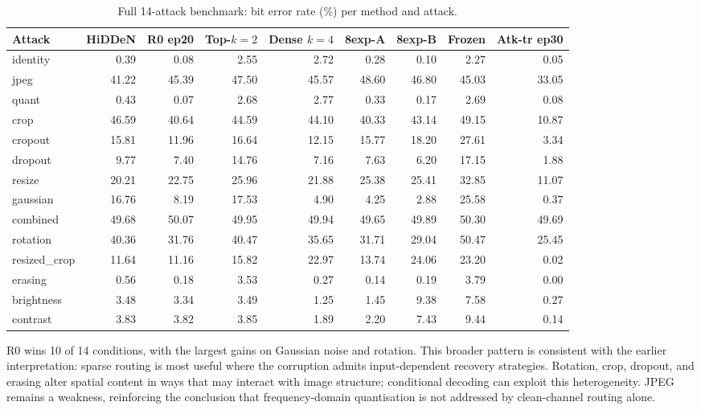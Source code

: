 ﻿\documentclass[12pt, a4paper, twoside]{report}
\numberwithin{equation}{chapter}
\begin{document}
\begin{table}[H]
\centering
\small
\begin{tabular}{@{}l@{\hskip 0.45em}r r r r r r r r@{}}
\toprule
Attack & HiDDeN & R0 ep20 & Top-$k{=}2$ & Dense $k{=}4$ & 8exp-A & 8exp-B & Frozen & Atk-tr ep30 \\
\midrule
identity & 0.39 & 0.08 & 2.55 & 2.72 & 0.28 & 0.10 & 2.27 & 0.05 \\
jpeg & 41.22 & 45.39 & 47.50 & 45.57 & 48.60 & 46.80 & 45.03 & 33.05 \\
quant & 0.43 & 0.07 & 2.68 & 2.77 & 0.33 & 0.17 & 2.69 & 0.08 \\
crop & 46.59 & 40.64 & 44.59 & 44.10 & 40.33 & 43.14 & 49.15 & 10.87 \\
cropout & 15.81 & 11.96 & 16.64 & 12.15 & 15.77 & 18.20 & 27.61 & 3.34 \\
dropout & 9.77 & 7.40 & 14.76 & 7.16 & 7.63 & 6.20 & 17.15 & 1.88 \\
resize & 20.21 & 22.75 & 25.96 & 21.88 & 25.38 & 25.41 & 32.85 & 11.07 \\
gaussian & 16.76 & 8.19 & 17.53 & 4.90 & 4.25 & 2.88 & 25.58 & 0.37 \\
combined & 49.68 & 50.07 & 49.95 & 49.94 & 49.65 & 49.89 & 50.30 & 49.69 \\
rotation & 40.36 & 31.76 & 40.47 & 35.65 & 31.71 & 29.04 & 50.47 & 25.45 \\
resized\_crop & 11.64 & 11.16 & 15.82 & 22.97 & 13.74 & 24.06 & 23.20 & 0.02 \\
erasing & 0.56 & 0.18 & 3.53 & 0.27 & 0.14 & 0.19 & 3.79 & 0.00 \\
brightness & 3.48 & 3.34 & 3.49 & 1.25 & 1.45 & 9.38 & 7.58 & 0.27 \\
contrast & 3.83 & 3.82 & 3.85 & 1.89 & 2.20 & 7.43 & 9.44 & 0.14 \\
\bottomrule
\end{tabular}
\caption{Full 14-attack benchmark: bit error rate (\%) per method and attack.}
\label{tab:attack-14-all}
\end{table}

R0 wins 10 of 14 conditions, with the largest gains on Gaussian noise and rotation. This broader pattern is consistent with the earlier interpretation: sparse routing is most useful where the corruption admits input-dependent recovery strategies. Rotation, crop, dropout, and erasing alter spatial content in ways that may interact with image structure; conditional decoding can exploit this heterogeneity. JPEG remains a weakness, reinforcing the conclusion that frequency-domain quantisation is not addressed by clean-channel routing alone.
\end{document}
